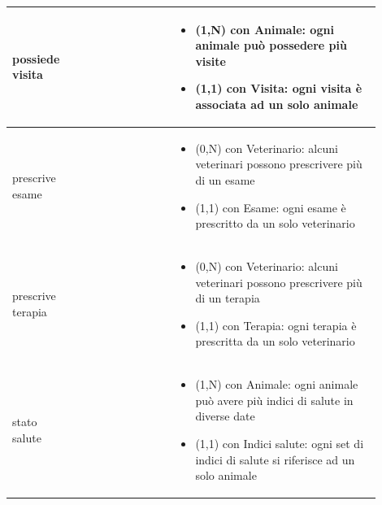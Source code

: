 \documentclass[12pt,a4paper]{article}
\begin{document}
\begin{center}
\begin{longtable}{|p{0.16\linewidth}|p{0.24\linewidth}|p{0.50\linewidth}|}
\hline
possiede visita					& \begin{flushleft}\vspace{-15pt} \end{flushleft}
					& \begin{itemize}
						\setlength{\itemindent}{-1em}
						\vspace{-25pt}
						\setlength\itemsep{-0.25em}
						\item (1,N) con Animale: ogni animale può possedere più visite
						\item (1,1) con Visita: ogni visita è associata ad un solo animale
					\end{itemize}\\ 

\hline
prescrive esame 				& \begin{flushleft}\vspace{-15pt}  \end{flushleft}
					& \begin{itemize}
						\setlength{\itemindent}{-1em}
						\vspace{-25pt}
						\setlength\itemsep{-0.25em}
						\item (0,N) con Veterinario: alcuni veterinari possono prescrivere più di un esame
						\item (1,1) con Esame: ogni esame è prescritto da un solo veterinario
					\end{itemize}\\ 

\hline
prescrive terapia 				& \begin{flushleft}\vspace{-15pt}  \end{flushleft}
					& \begin{itemize}
						\setlength{\itemindent}{-1em}
						\vspace{-25pt}
						\setlength\itemsep{-0.25em}
						\item (0,N) con Veterinario: alcuni veterinari possono prescrivere più di un terapia
						\item (1,1) con Terapia: ogni terapia è prescritta da un solo veterinario
					\end{itemize}\\ 

\hline
stato salute 				& \begin{flushleft}\vspace{-15pt}  \end{flushleft}
					& \begin{itemize}
						\setlength{\itemindent}{-1em}
						\vspace{-25pt}
						\setlength\itemsep{-0.25em}
						\item (1,N) con Animale: ogni animale può avere più indici di salute in diverse date
						\item (1,1) con Indici salute: ogni set di indici di salute si riferisce ad un solo animale
					\end{itemize}\\ 

\hline

\end{longtable}
\end{center}
\pagebreak
\end{document}
